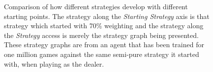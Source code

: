 \begin{figure}
\caption{
	Comparison of how different strategies develop with different
	starting points.
	The strategy along the \textit{Starting Strategy} axis is that strategy
	which started with 70\% weighting
	and the strategy along the \textit{Strategy} access is
	merely the strategy graph being presented.
	These strategy graphs are from an agent that has been trained for one
	million games
	against the same semi-pure strategy it started with,
	when playing as the dealer.
}
\label{fig:findings-expts-sanitycheck-matrix}
\end{figure}
